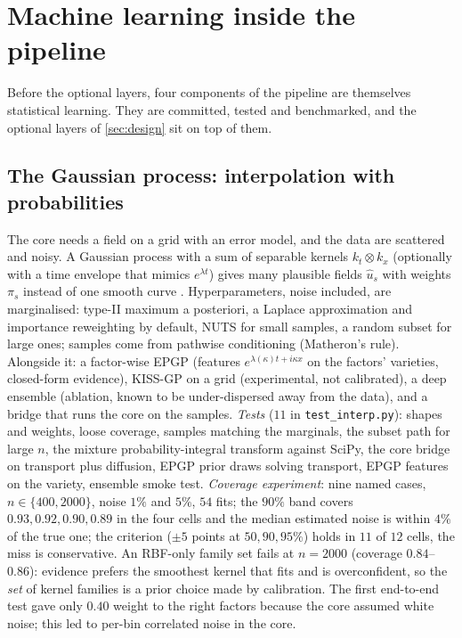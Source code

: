 \section{Machine learning inside the pipeline}\label{sec:inside-ml}
Before the optional layers, four components of the pipeline are themselves statistical learning. They are committed, tested and benchmarked, and the optional layers of \cref{sec:design} sit on top of them.

\subsection{The Gaussian process: interpolation with probabilities}\label{sec:gp}
The core needs a field on a grid with an error model, and the data are scattered and noisy. A Gaussian process with a sum of separable kernels $k_t\otimes k_x$ (optionally with a time envelope that mimics $e^{\lambda t}$)
gives many plausible fields $\hat u_s$ with weights $\pi_s$ instead of one smooth curve \cite{RasWil06}. Hyperparameters, noise included, are marginalised: type-II maximum a posteriori, a Laplace approximation and importance reweighting by default,
NUTS for small samples, a random subset for large ones; samples come from pathwise conditioning (Matheron's rule). Alongside it: a factor-wise EPGP (features $e^{\lambda(\kappa)t+i\kappa x}$ on the factors' varieties, closed-form evidence),
KISS-GP on a grid (experimental, not calibrated), a deep ensemble (ablation, known to be under-dispersed away from the data), and a bridge that runs the core on the samples.
\emph{Tests} ($11$ in \texttt{test\_interp.py}): shapes and weights, loose coverage, samples matching the marginals, the subset path for large $n$, the mixture probability-integral transform against SciPy, the core bridge on transport plus diffusion,
EPGP prior draws solving transport, EPGP features on the variety, ensemble smoke test.
\emph{Coverage experiment}: nine named cases, $n\in\{400,2000\}$, noise $1\%$ and $5\%$, $54$ fits; the $90\%$ band covers $0.93, 0.92, 0.90, 0.89$ in the four cells and the median estimated noise is within $4\%$ of the true one; the criterion ($\pm5$ points at $50,90,95\%$) holds in $11$ of $12$ cells, the miss is conservative.
An RBF-only family set fails at $n=2000$ (coverage $0.84$--$0.86$): evidence prefers the smoothest kernel that fits and is overconfident, so the \emph{set} of kernel families is a prior choice made by calibration.
The first end-to-end test gave only $0.40$ weight to the right factors because the core assumed white noise; this led to per-bin correlated noise in the core.

